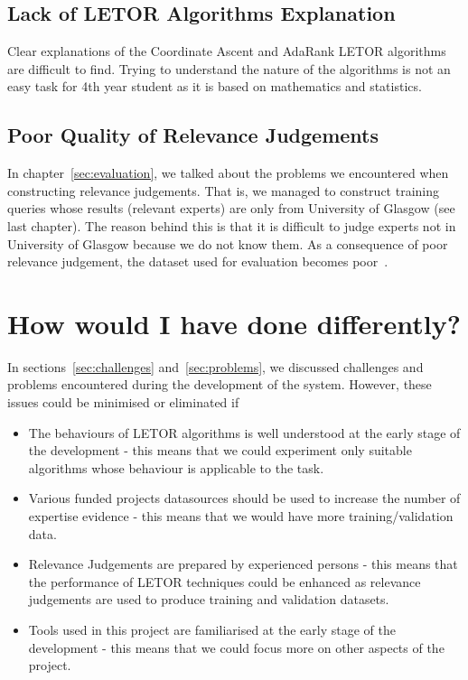 \subsection{Lack of LETOR Algorithms Explanation}
Clear explanations of the Coordinate Ascent and AdaRank LETOR algorithms are difficult to find. Trying to understand the nature of 
the algorithms is not an easy task for 4th year student as it is based on mathematics and statistics.

\subsection{Poor Quality of Relevance Judgements}
In chapter~\ref{sec:evaluation}, we talked about the problems we encountered when constructing relevance judgements. That is,
we managed to construct training queries whose results (relevant experts) are only from University of Glasgow (see last chapter). 
The reason behind this is that it is difficult to judge experts not in University of Glasgow because we do not know them.
As a consequence of poor relevance judgement, the dataset used for evaluation becomes poor~\cite{craig}.


\section{How would I have done differently?}
In sections~\ref{sec:challenges} and~\ref{sec:problems}, we discussed challenges and problems encountered during the development of the system.
However, these issues could be minimised or eliminated if 
\begin{itemize}
 \item The behaviours of LETOR algorithms is well understood at the early stage of the development - this means that we could experiment only 
 suitable algorithms whose behaviour is applicable to the task.
 \item Various funded projects datasources should be used to increase the number of expertise evidence - this means that we would have more training/validation
 data.
 \item Relevance Judgements are prepared by experienced persons - this means that the performance of LETOR techniques could be enhanced as relevance judgements
 are used to produce training and validation datasets.
 \item Tools used in this project are familiarised at the early stage of the development - this means that we could focus more on other aspects of the 
 project.
\end{itemize}


